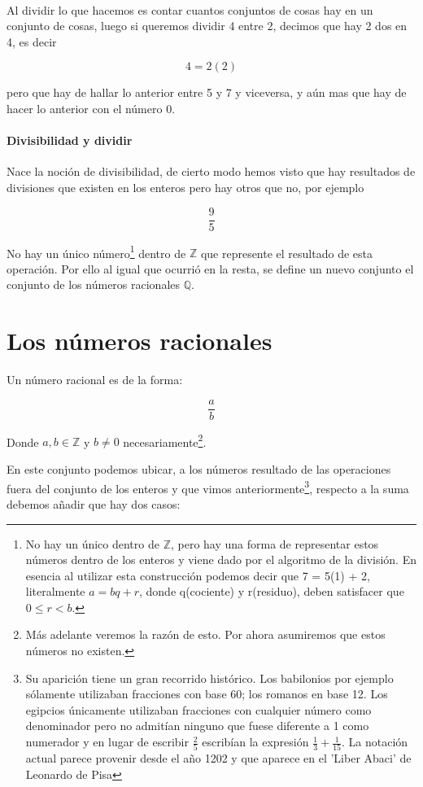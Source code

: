 \documentclass{article}
\begin{document}
\paragraph{}Al dividir lo que hacemos es contar cuantos conjuntos de cosas hay en un conjunto de cosas, luego si queremos dividir 4 entre 2, decimos que hay 2 dos en 4, es decir

$$4 = 2(2)$$

pero que hay de hallar lo anterior entre 5 y 7 y viceversa, y aún mas que hay de hacer lo anterior con el número 0.

\paragraph{Divisibilidad y dividir} Nace la noción de divisibilidad, de cierto modo hemos visto que hay resultados de divisiones que existen en los enteros pero hay otros que no, por ejemplo

$$\frac{9}{5}$$

No hay un único número\footnote{No hay un único dentro de $\mathbb{Z}$, pero hay una forma de representar estos números dentro de los enteros y viene dado por el algoritmo de la división. En esencia al utilizar esta construcción podemos decir que 7 = 5(1) + 2, literalmente $a = bq + r$, donde q(cociente) y r(residuo), deben satisfacer que $0 \leq r<b$.} dentro de $\mathbb{Z}$ que represente el resultado de esta operación. Por ello al igual que ocurrió en la resta, se define un nuevo conjunto el conjunto de los números racionales $\mathbb{Q}$.

\section{Los números racionales}

Un número racional es de la forma:

$$\frac{a}{b}$$

Donde $a, b \in \mathbb{Z}$ y $b \neq 0$ necesariamente\footnote{Más adelante veremos la razón de esto. Por ahora asumiremos que estos números no existen.}.

En este conjunto podemos ubicar, a los números resultado de las operaciones fuera del conjunto de los enteros y que vimos anteriormente\footnote{Su aparición tiene un gran recorrido histórico. Los babilonios por ejemplo sólamente utilizaban fracciones con base 60; los romanos en base 12. Los egipcios únicamente utilizaban fracciones con cualquier número como denominador pero no admitían ninguno que fuese diferente a 1 como numerador y en lugar de escribir $\frac{2}{5}$ escribían la expresión $\frac{1}{3} + \frac{1}{15}$. La notación actual parece provenir desde el año 1202 y que aparece en el 'Liber Abaci' de Leonardo de Pisa\cite{patino_duque_1977}}, respecto a la suma debemos añadir que hay dos casos:
\end{document}
